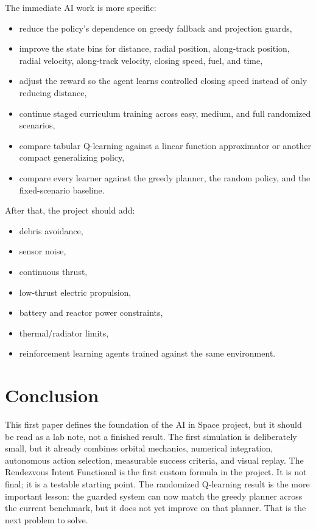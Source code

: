 \documentclass[11pt]{article}
\begin{document}
The immediate AI work is more specific:

\begin{itemize}
    \item reduce the policy's dependence on greedy fallback and projection guards,
    \item improve the state bins for distance, radial position, along-track position, radial velocity, along-track velocity, closing speed, fuel, and time,
    \item adjust the reward so the agent learns controlled closing speed instead of only reducing distance,
    \item continue staged curriculum training across easy, medium, and full randomized scenarios,
    \item compare tabular Q-learning against a linear function approximator or another compact generalizing policy,
    \item compare every learner against the greedy planner, the random policy, and the fixed-scenario baseline.
\end{itemize}

After that, the project should add:

\begin{itemize}
    \item debris avoidance,
    \item sensor noise,
    \item continuous thrust,
    \item low-thrust electric propulsion,
    \item battery and reactor power constraints,
    \item thermal/radiator limits,
    \item reinforcement learning agents trained against the same environment.
\end{itemize}

\section{Conclusion}

This first paper defines the foundation of the AI in Space project, but it should be read as a lab note, not a finished result.
The first simulation is deliberately small, but it already combines orbital mechanics, numerical integration, autonomous action selection, measurable success criteria, and visual replay.
The Rendezvous Intent Functional is the first custom formula in the project.
It is not final; it is a testable starting point.
The randomized Q-learning result is the more important lesson: the guarded system can now match the greedy planner across the current benchmark, but it does not yet improve on that planner.
That is the next problem to solve.
\end{document}
